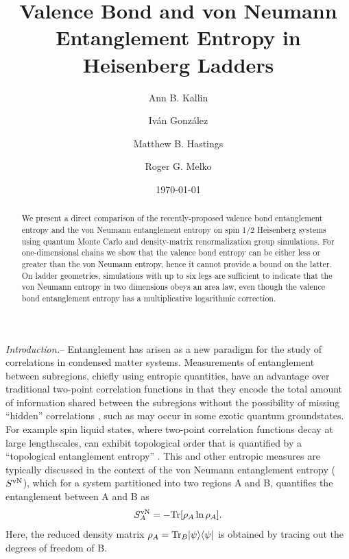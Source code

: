 \documentclass[prl,aps,twocolumn,floatfix,amsmath,amssymb,superscriptaddress,tightenlines]{revtex4}
\begin{document}
\date{\today}
\title{Valence Bond and von Neumann Entanglement Entropy in Heisenberg Ladders}
\author{Ann B. Kallin}

\author{Iv\'an Gonz\'alez}

\author{Matthew B. Hastings}

\author{Roger G. Melko}

\begin{abstract} We present a direct comparison of the recently-proposed
valence bond entanglement entropy and the von Neumann entanglement entropy on
spin 1/2 Heisenberg systems using quantum Monte Carlo and density-matrix
renormalization group simulations.  For one-dimensional chains we
show that the valence bond entropy can be either less or greater than the
von Neumann entropy, hence it cannot provide a bound on the latter.  
On ladder geometries, simulations with up to six legs are sufficient to indicate that
the von Neumann entropy in two dimensions obeys an area law,
even though the valence bond entanglement entropy 
has a multiplicative logarithmic correction.
\end{abstract}
\maketitle


{\it Introduction.}-- Entanglement has arisen 
as a new paradigm for the study of correlations in condensed matter systems.  
Measurements
of entanglement between subregions, chiefly using entropic
quantities, have an advantage over traditional two-point correlation
functions in that they encode the total amount of information shared
between the subregions without the possibility of missing ``hidden''
correlations \cite{wolf},
such as may occur in some exotic quantum groundstates.   For example spin liquid states, 
where two-point correlation functions decay at large lengthscales, can exhibit topological order that is quantified by a ``topological entanglement
entropy''  \cite{ KP}.
This and other entropic measures are typically discussed in the context of
the von Neumann entanglement entropy ($S^{\rm vN}$), which for a system partitioned into
two regions A and B, quantifies the entanglement between A and B as
\begin{equation} 
S^{\rm vN}_A = - {\rm Tr} [ \rho_A \ln \rho_A ]. \label{vNEE} 
\end{equation}
Here, the reduced density matrix $\rho_A = {\rm Tr}_B | \psi \rangle
\langle \psi |$ is obtained by tracing out the degrees of freedom
of B.
\end{document}
